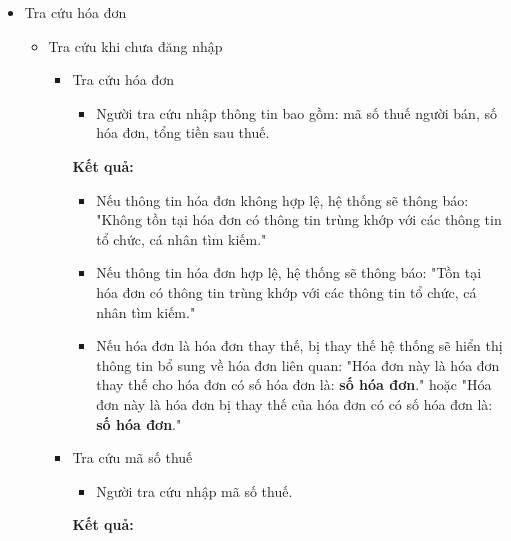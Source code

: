 \begin{itemize}
\begin{itemize}
\end{itemize}

\item Tra cứu hóa đơn

\begin{itemize}

\item Tra cứu khi chưa đăng nhập

\begin{itemize}

\item Tra cứu hóa đơn

\begin{itemize}

\item Người tra cứu nhập thông tin bao gồm: mã số thuế người bán, số hóa đơn, tổng tiền sau thuế.

\end{itemize}

\textbf{Kết quả:}

\begin{itemize}

\item Nếu thông tin hóa đơn không hợp lệ, hệ thống sẽ thông báo: "Không tồn tại hóa đơn có thông tin trùng khớp với các thông tin tổ chức, cá nhân tìm kiếm." %

\item Nếu thông tin hóa đơn hợp lệ, hệ thống sẽ thông báo: "Tồn tại hóa đơn có thông tin trùng khớp với các thông tin tổ chức, cá nhân tìm kiếm." %

\item Nếu hóa đơn là hóa đơn thay thế, bị thay thế hệ thống sẽ hiển thị thông tin bổ sung về hóa đơn liên quan: "Hóa đơn này là hóa đơn thay thế cho hóa đơn có số hóa đơn là: \textbf{số hóa đơn}." hoặc "Hóa đơn này là hóa đơn bị thay thế của hóa đơn có có số hóa đơn là: \textbf{số hóa đơn}." %

\end{itemize}

\item Tra cứu mã số thuế

\begin{itemize}

\item Người tra cứu nhập mã số thuế.

\end{itemize}

\textbf{Kết quả:}

\begin{itemize}


\end{itemize}
\end{itemize}
\end{itemize}
\end{itemize}
